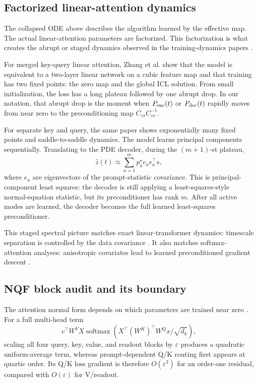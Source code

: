 \documentclass[11pt,a4paper]{article}
\theoremstyle{definition}
\newcommand{\wh}{\widehat}
\begin{document}
\subsection{Factorized linear-attention dynamics}

The collapsed ODE above describes the algorithm learned by the effective map.
The actual linear-attention parameters are factorized.  This factorization is
what creates the abrupt or staged dynamics observed in the training-dynamics
papers \cite{zhang2025trainingdynamics,mainali2025exactdynamics}.

For merged key-query linear attention, Zhang et al. \cite{zhang2025trainingdynamics}
show that the model is
equivalent to a two-layer linear network on a cubic feature map and that
training has two fixed points: the zero map and the global ICL solution.  From
small initialization, the loss has a long plateau followed by one abrupt drop.
In our notation, that abrupt drop is the moment when
$P_{\rm enc}(t)$ or $P_{\rm dec}(t)$ rapidly moves from near zero to the
preconditioning map $C_{zs}C_{ss}^{-1}$.

For separate key and query, the same paper shows exponentially many fixed
points and saddle-to-saddle dynamics.  The model learns principal components
sequentially.  Translating to the PDE decoder, during the $(m+1)$-st plateau,
\[
    \wh z(t)
    \approx
    \sum_{a=1}^{m}
    p_a^\star e_ae_a^\top s,
\]
where $e_a$ are eigenvectors of the prompt-statistic covariance.  This is
principal-component least squares: the decoder is still applying a
least-squares-style normal-equation statistic, but its preconditioner has rank
$m$.  After all active modes are learned, the decoder becomes the full learned
least-squares preconditioner.

This staged spectral picture matches exact linear-transformer dynamics:
timescale separation is controlled by the data covariance
\cite{mainali2025exactdynamics}.  It also matches softmax-attention analyses:
anisotropic covariates lead to learned preconditioned gradient descent
\cite{he2025demystified}.

\subsection{NQF block audit and its boundary}

The attention normal form depends on which parameters are trained near zero
\cite{ziyin2026nqf}.  For a full multi-head term
\[
 v^\top W^V X\operatorname{softmax}
 \left(X^\top(W^K)^\top W^Qx/\sqrt{d_k}\right),
\]
scaling all four query, key, value, and readout blocks by $\varepsilon$
produces a quadratic uniform-average term, whereas prompt-dependent Q/K
routing first appears at quartic order.  Its Q/K loss gradient is therefore
$O(\varepsilon^3)$ for an order-one residual, compared with
$O(\varepsilon)$ for V/readout.
\end{document}
